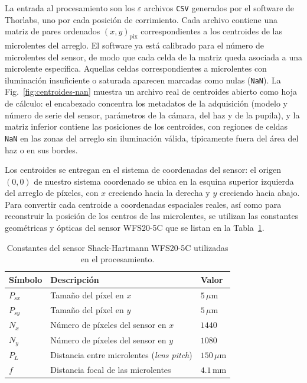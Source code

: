 \documentclass[letterpaper,12pt,oneside]{book}
\begin{document}
La entrada al procesamiento son los $\varepsilon$ archivos \texttt{CSV} generados por el
software de Thorlabs, uno por cada posición de corrimiento. Cada archivo contiene una
matriz de pares ordenados $(x,y)_{\text{pix}}$ correspondientes a los centroides de las
microlentes del arreglo. El software ya está calibrado para el número de microlentes del
sensor, de modo que cada celda de la matriz queda asociada a una microlente específica.
Aquellas celdas correspondientes a microlentes con iluminación insuficiente o saturada
aparecen marcadas como nulas (\texttt{NaN}). La Fig.~\ref{fig:centroides-nan} muestra un
archivo real de centroides abierto como hoja de cálculo: el encabezado concentra los
metadatos de la adquisición (modelo y número de serie del sensor, parámetros de la cámara,
del haz y de la pupila), y la matriz inferior contiene las posiciones de los centroides,
con regiones de celdas \texttt{NaN} en las zonas del arreglo sin iluminación válida,
típicamente fuera del área del haz o en sus bordes.

Los centroides se entregan en el sistema de coordenadas del sensor: el origen $(0,0)$ de
nuestro sistema coordenado se ubica en la esquina superior izquierda del arreglo de
píxeles, con $x$ creciendo hacia la derecha y $y$ creciendo hacia abajo. Para convertir
cada centroide a coordenadas espaciales reales, así como para reconstruir la posición de
los centros de las microlentes, se utilizan las constantes geométricas y ópticas del
sensor WFS20-5C que se listan en la Tabla~\ref{tab:constantes-sensor}.

\begin{table}[htbp]
\centering
\caption{Constantes del sensor Shack-Hartmann WFS20-5C utilizadas en el procesamiento.}
\label{tab:constantes-sensor}
\begin{tabular}{l l l}
\hline
Símbolo & Descripción & Valor \\
\hline
$P_{sx}$ & Tamaño del píxel en $x$ & $5\,\mu\text{m}$ \\
$P_{sy}$ & Tamaño del píxel en $y$ & $5\,\mu\text{m}$ \\
$N_x$ & Número de píxeles del sensor en $x$ & $1440$ \\
$N_y$ & Número de píxeles del sensor en $y$ & $1080$ \\
$P_L$ & Distancia entre microlentes (\textit{lens pitch}) & $150\,\mu\text{m}$ \\
$f$ & Distancia focal de las microlentes & $4.1\,\text{mm}$ \\
\hline
\end{tabular}
\end{table}
\end{document}
